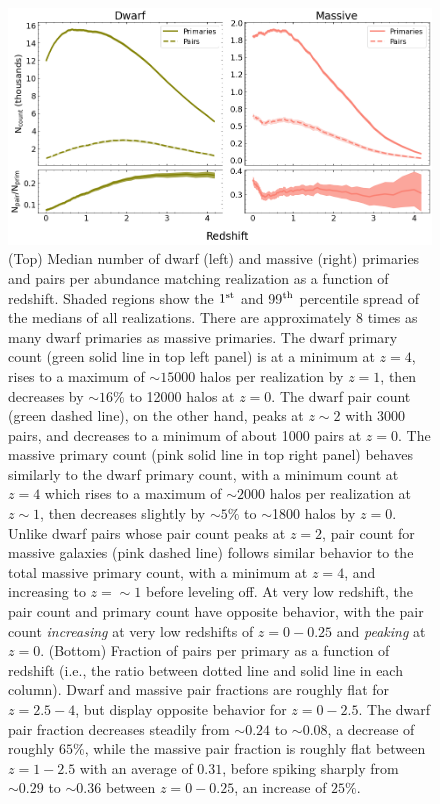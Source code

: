 \documentclass[twocolumn]{aastex631}
\begin{document}
  \begin{figure}[htb]
    \centering
    \includegraphics[width=\textwidth]{counts_1000.png}
    \caption{(Top) Median number of dwarf (left) and massive (right) primaries and pairs per abundance matching realization as a function of redshift.
    Shaded regions show the $1^{\rm st}$ and 99$^{\rm th}$ percentile spread of the medians of all realizations. 
    There are approximately 8 times as many dwarf primaries as massive primaries. 
    The dwarf primary count (green solid line in top left panel) is at a minimum at $z=4$, rises to a maximum of $\sim15000$ halos per realization by $z=1$, then decreases by $\sim16\%$ to 12000 halos at $z=0$. The dwarf pair count (green dashed line), on the other hand, peaks at $z\sim2$ with 3000 pairs, and decreases to a minimum of about 1000 pairs at $z=0$.
    The massive primary count (pink solid line in top right panel) behaves similarly to the dwarf primary count, with a minimum count at $z=4$ which rises to a maximum of $\sim2000$ halos per realization at $z\sim1$, then decreases slightly by $\sim5\%$ to $\sim$1800 halos by $z=0$. 
    Unlike dwarf pairs whose pair count peaks at $z=2$, pair count for massive galaxies (pink dashed line) follows similar behavior to the total massive primary count, with a minimum at $z=4$, and increasing to $z=\sim 1$ before leveling off. At very low redshift, the pair count and primary count have opposite behavior, with the pair count \textit{increasing} at very low redshifts of $z=0-0.25$ and \textit{peaking} at $z=0$.
    (Bottom) Fraction of pairs per primary as a function of redshift (i.e., the ratio between dotted line and solid line in each column). Dwarf and massive pair fractions are roughly flat for $z=2.5-4$, but display opposite behavior for $z=0-2.5$. The dwarf pair fraction decreases steadily from $\sim0.24$ to $\sim0.08$, a decrease of roughly $65\%$, while the massive pair fraction is roughly flat between $z=1-2.5$ with an average of $0.31$, before spiking sharply from $\sim 0.29$ to $\sim 0.36$ between $z=0-0.25$, an increase of $25\%$.}
    \label{fig:counts}
  \end{figure}
\end{document}
